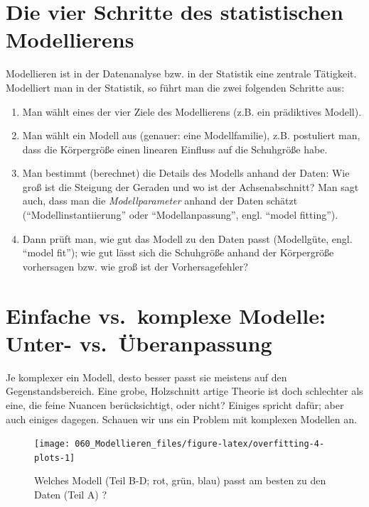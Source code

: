 \documentclass[12pt,ngerman,]{book}
\providecommand{\tightlist}{%
  \setlength{\itemsep}{0pt}\setlength{\parskip}{0pt}}
\theoremstyle{definition}
\theoremstyle{definition}
\theoremstyle{remark}
\begin{document}
\section{Die vier Schritte des statistischen
Modellierens}\label{die-vier-schritte-des-statistischen-modellierens}

Modellieren ist in der Datenanalyse bzw. in der Statistik eine zentrale
Tätigkeit. Modelliert man in der Statistik, so führt man die zwei
folgenden Schritte aus:

\begin{enumerate}
\def\labelenumi{\arabic{enumi}.}
\tightlist
\item
  Man wählt eines der vier Ziele des Modellierens (z.B. ein prädiktives
  Modell).
\item
  Man wählt ein Modell aus (genauer: eine Modellfamilie), z.B.
  postuliert man, dass die Körpergröße einen linearen Einfluss auf die
  Schuhgröße habe.
\item
  Man bestimmt (berechnet) die Details des Modells anhand der Daten: Wie
  groß ist die Steigung der Geraden und wo ist der Achsenabschnitt? Man
  sagt auch, dass man die \emph{Modellparameter} anhand der Daten
  schätzt (``Modellinstantiierung'' oder ``Modellanpassung'', engl.
  ``model fitting'').
\item
  Dann prüft man, wie gut das Modell zu den Daten passt (Modellgüte,
  engl. ``model fit''); wie gut lässt sich die Schuhgröße anhand der
  Körpergröße vorhersagen bzw. wie groß ist der Vorhersagefehler?
\end{enumerate}

\section{Einfache vs.~komplexe Modelle: Unter-
vs.~Überanpassung}\label{einfache-vs.komplexe-modelle-unter--vs.uberanpassung}

Je komplexer ein Modell, desto besser passt sie meistens auf den
Gegenstandsbereich. Eine grobe, Holzschnitt artige Theorie ist doch
schlechter als eine, die feine Nuancen berücksichtigt, oder nicht?
Einiges spricht dafür; aber auch einiges dagegen. Schauen wir uns ein
Problem mit komplexen Modellen an.

\begin{figure}

{\centering \texttt{[image: 060\_Modellieren\_files/figure-latex/overfitting-4-plots-1]} 

}

\caption{Welches Modell (Teil B-D; rot, grün, blau) passt am besten zu den Daten (Teil A) ?}\label{fig:overfitting-4-plots}
\end{figure}
\end{document}
